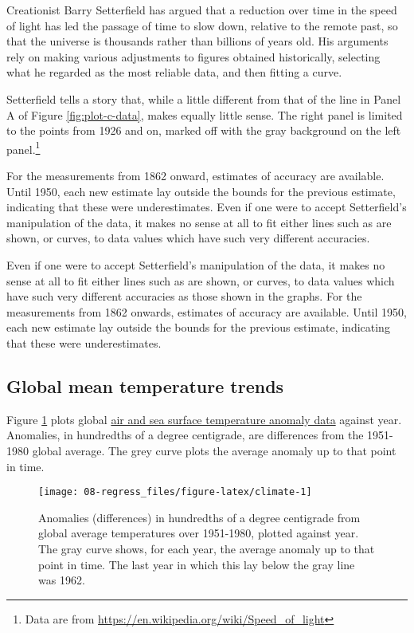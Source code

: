 \documentclass[
  10ptls,
  b5paper]{book}
\begin{document}
Creationist Barry Setterfield has argued that a reduction over time in the speed of light has led the passage of time to slow down, relative to the remote past, so that the universe is thousands rather than billions of years old. His arguments rely on making various adjustments to figures obtained historically, selecting what he regarded as the most reliable data, and then fitting a curve.

Setterfield tells a story that, while a little different from that of the line in Panel A of Figure \ref{fig:plot-c-data}, makes equally little sense. The right panel is limited to the points from 1926 and on, marked off with the gray background on the left panel.\footnote{Data are from \url{https://en.wikipedia.org/wiki/Speed_of_light}}

For the measurements from 1862 onward, estimates of accuracy are available. Until 1950, each new estimate lay outside the bounds for the previous estimate, indicating that these were underestimates. Even if one were to accept Setterfield's manipulation of the data, it makes no sense at all to fit either lines such as are shown, or curves, to data values which have such very different accuracies.

Even if one were to accept Setterfield's manipulation of the data, it makes no sense at all to fit either lines such as are shown, or curves, to data values which have such very different accuracies as those shown in the graphs. For the measurements from 1862 onwards, estimates of accuracy are available. Until 1950, each new estimate lay outside the bounds for the previous estimate, indicating that these were underestimates.

\subsection{Global mean temperature trends}\label{global-mean-temperature-trends}

Figure \ref{fig:climate} plots global \href{https://iridl.ldeo.columbia.edu/SOURCES/.NASA/.GISS/.GISSTEMP/.Global/.LOTI/}{air and sea surface temperature anomaly data} against year. Anomalies, in hundredths of a degree centigrade, are differences from the 1951-1980 global average. The grey curve plots the average anomaly up to that point in time.

\begin{figure}[H]

{\centering \texttt{[image: 08-regress\_files/figure-latex/climate-1]} 

}

\caption{Anomalies (differences) in hundredths of a degree centigrade
from global average temperatures over 1951-1980, plotted against year.
The gray curve shows, for each year, the average anomaly up to that
point in time.  The last year in which this lay below the gray line
was 1962.}\label{fig:climate}
\end{figure}
\end{document}
